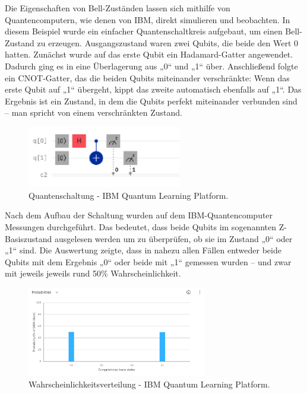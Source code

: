 Die Eigenschaften von Bell-Zuständen lassen sich mithilfe von Quantencomputern, wie denen von IBM, direkt simulieren und beobachten. In diesem Beispiel wurde ein einfacher Quantenschaltkreis aufgebaut, um einen Bell-Zustand zu erzeugen. Ausgangszustand waren zwei Qubits, die beide den Wert 0 hatten. Zunächst wurde auf das erste Qubit ein Hadamard-Gatter angewendet. Dadurch ging es in eine Überlagerung aus „0“ und „1“ über. Anschließend folgte ein CNOT-Gatter, das die beiden Qubits miteinander verschränkte: Wenn das erste Qubit auf „1“ übergeht, kippt das zweite automatisch ebenfalls auf „1“. Das Ergebnis ist ein Zustand, in dem die Qubits perfekt miteinander verbunden sind – man spricht von einem verschränkten Zustand. 

\begin{figure}[h]
    \centering
    \includegraphics[width=0.6\textwidth]{images/Schaltung_IBM.png}
    \caption{Quantenschaltung - IBM Quantum Learning Platform.}
    \label{fig:meinbild}
\end{figure}

Nach dem Aufbau der Schaltung wurden auf dem IBM-Quantencomputer Messungen durchgeführt. Das bedeutet, dass beide Qubits im sogenannten Z-Basiszustand ausgelesen werden um zu überprüfen, ob sie im Zustand „0“ oder „1“ sind. Die Auswertung zeigte, dass in nahezu allen Fällen entweder beide Qubits mit dem Ergebnis „0“ oder beide mit „1“ gemessen wurden – und zwar mit jeweils jeweils rund 50\% Wahrscheinlichkeit.

\begin{figure}[h]
    \centering
    \includegraphics[width=0.7\textwidth]{images/results_ibm.png}
    \caption{Wahrscheinlichkeitsverteilung - IBM Quantum Learning Platform.}
    \label{fig:meinbild}
\end{figure}

